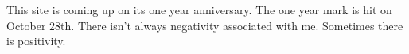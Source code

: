 This site is coming up on its one year anniversary. The one year mark is
hit on October 28th. There isn't always negativity associated with me.
Sometimes there is positivity.
